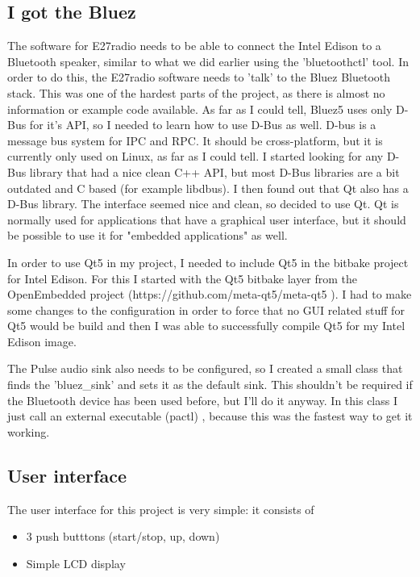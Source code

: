 \documentclass[12pt,a4paper]{scrreprt}
\begin{document}
\subsection{I got the Bluez}
The software for E27radio needs to be able to connect the Intel Edison to a Bluetooth speaker, similar to what we did earlier using the 'bluetoothctl' tool.
In order to do this, the E27radio software needs to 'talk' to the Bluez Bluetooth stack. 
This was one of the hardest parts of the project, as there is almost no information or example code available. 
As far as I could tell, Bluez5 uses only D-Bus for it's API, so I needed to learn how to use D-Bus as well.
D-bus is a message bus system for IPC and RPC. It should be cross-platform, but it is currently only used on Linux, as far as I could tell.
I started looking for any D-Bus library that had a nice clean C++ API, but most D-Bus libraries are a bit outdated and C based (for example libdbus).
I then found out that Qt also has a D-Bus library. The interface seemed nice and clean, so decided to use Qt. 
Qt is normally used for applications that have a graphical user interface, but it should be possible to use it for "embedded applications" as well.

In order to use Qt5 in my project, I needed to include Qt5 in the bitbake project for Intel Edison. For this I started with the Qt5 bitbake layer from the OpenEmbedded project (https://github.com/meta-qt5/meta-qt5 ). I had to make some changes to the configuration in order to force that no GUI related stuff for Qt5 would be build and then I was able to successfully compile Qt5 for my Intel Edison image. 

The Pulse audio sink also needs to be configured, so I created a small class that finds the 'bluez\_sink' and sets it as the default sink. This shouldn't be required if the Bluetooth device has been used before, but I'll do it anyway. In this class I just call an external executable (pactl) , because this was the fastest way to get it working.

\subsection{User interface}
The user interface for this project is very simple: it consists of
\begin{itemize}
	\item 3 push butttons (start/stop, up, down)
	\item Simple LCD display 
\end{itemize}
\end{document}

